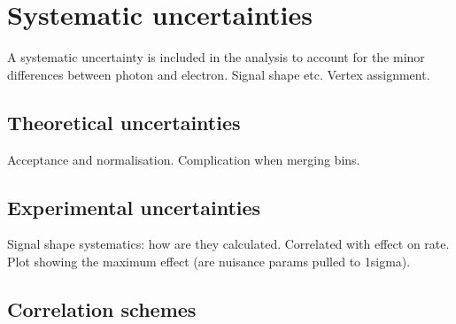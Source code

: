 \section{Systematic uncertainties}\label{sec:systematics}
A systematic uncertainty is included in the analysis to account for the minor differences between photon and electron. Signal shape etc. Vertex assignment.
\subsection{Theoretical uncertainties}
Acceptance and normalisation. Complication when merging bins.

\subsection{Experimental uncertainties}
Signal shape systematics: how are they calculated. Correlated with effect on rate. Plot showing the maximum effect (are nuisance params pulled to 1sigma).


\subsection{Correlation schemes}